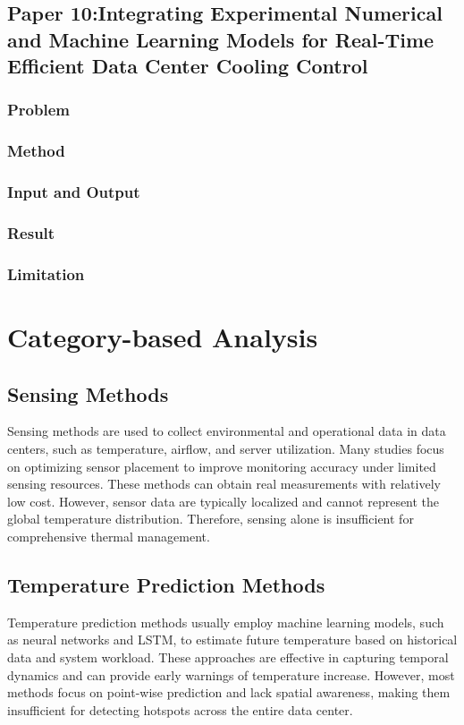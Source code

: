 \documentclass[12pt,a4paper]{article}
\begin{document}
\newpage
\subsection{Paper 10:Integrating Experimental Numerical and Machine Learning Models for Real-Time Efficient Data Center Cooling Control}
    \subsubsection{Problem}
    \subsubsection{Method}
    \subsubsection{Input and Output}
    \subsubsection{Result}
    \subsubsection{Limitation}
\newpage

\section{Category-based Analysis}

    \subsection{Sensing Methods}
    Sensing methods are used to collect environmental and operational data in data centers, such as temperature, airflow, and server utilization. Many studies focus on optimizing sensor placement to improve monitoring accuracy under limited sensing resources. These methods can obtain real measurements with relatively low cost. However, sensor data are typically localized and cannot represent the global temperature distribution. Therefore, sensing alone is insufficient for comprehensive thermal management.

    \subsection{Temperature Prediction Methods}
    Temperature prediction methods usually employ machine learning models, such as neural networks and LSTM, to estimate future temperature based on historical data and system workload. These approaches are effective in capturing temporal dynamics and can provide early warnings of temperature increase. However, most methods focus on point-wise prediction and lack spatial awareness, making them insufficient for detecting hotspots across the entire data center.
\end{document}
